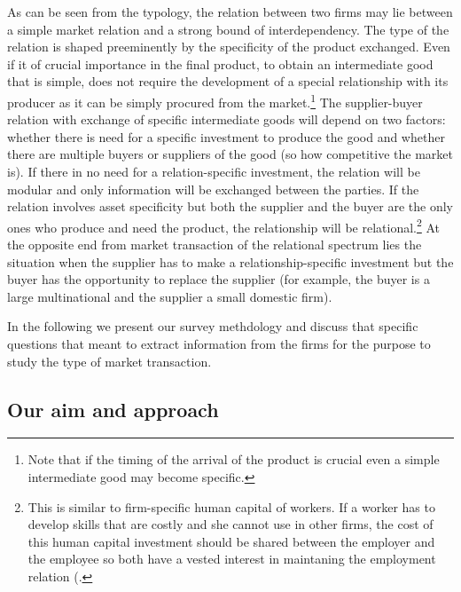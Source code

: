 \documentclass[final, dvipsnames, authoryear,12pt]{elsarticle}
\begin{document}
As can be seen from the typology, the relation between two firms may lie between a simple market relation and a strong bound of interdependency. The type of the relation is shaped preeminently by the specificity of the product exchanged. Even if it of crucial importance in the final product, to obtain an intermediate good that is simple, does not require the development of a special relationship with its producer as it can be simply procured from the market.\footnote{Note that if the timing of the arrival of the product is crucial even a simple intermediate good may become specific.} The supplier-buyer relation with exchange of specific intermediate goods will depend on two factors: whether there is need for a specific investment to produce the good and whether there are multiple buyers or suppliers of the good (so how competitive the market is). If there in no need for a relation-specific investment, the relation will be modular and only information will be exchanged between the parties. If the relation involves asset specificity but both the supplier and the buyer are the only ones who produce and need the product, the relationship will be relational.\footnote{This is similar to firm-specific human capital of workers. If a worker has to develop skills that are costly and she cannot use in other firms, the cost of this human capital investment should be shared between the employer and the employee so both have a vested interest in maintaning the employment relation (\cite{becker1962investment}.} At the opposite end from market transaction of the relational spectrum lies the situation when the supplier has to make a relationship-specific investment but the buyer has the opportunity to replace the supplier (for example, the buyer is a large multinational and the supplier a small domestic firm).  
    
    In the following we present our survey methdology and discuss that specific questions that meant to extract information from the firms for the purpose to study the type of market transaction.
  
\subsection{Our aim and approach}
\end{document}
